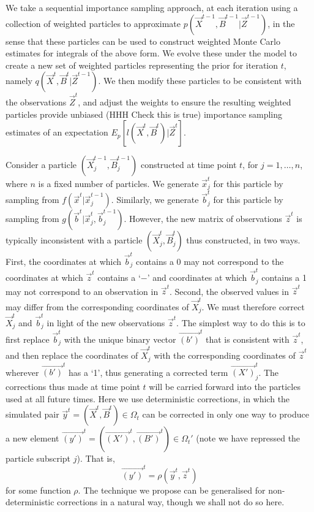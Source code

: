 We take a sequential importance sampling approach, at each iteration using a collection of weighted particles to approximate $p(\vec{X}^{t-1}, \vec{B}^{t-1} | \vec{Z}^{t-1})$, in the sense that these particles can be used to construct weighted Monte Carlo estimates for integrals of the above form. We evolve these under the model to create a new set of weighted particles representing the prior for iteration $t$, namely $q(\vec{X}^{t}, \vec{B}^{t} | \vec{Z}^{t-1})$. We then modify these particles to be consistent with the observations $\vec{Z}^{t}$, and adjust the weights to ensure the resulting weighted particles provide unbiased (HHH Check this is true) importance sampling estimates of an expectation $E_{p}[l(\vec{X}^{t}, \vec{B}^t) | \vec{Z}^t]$.

Consider a particle $(\vec{X}^{t-1}_j,\vec{B}^{t-1}_j)$ constructed at time point $t$, for $j = 1, \ldots, n$, where $n$ is a fixed number of particles. We generate $\vec{x}^t_j$ for this particle by sampling from $f(\vec{x}^t | \vec{x}^{t-1}_j)$. Similarly, we generate $\vec{b}^{t}_j$ for this particle by sampling from $g(\vec{b}^{t} | \vec{x}^t_j, \vec{b}^{t-1}_j)$. However, the new matrix of observations $\vec{z}^{t}$ is typically inconsistent with a particle $(\vec{X}^{t}_j, \vec{B}^{t}_j)$ thus constructed, in two ways. First, the coordinates at which $\vec{b}^{t}_j$ contains a 0 may not correspond to the coordinates at which $\vec{z}^{t}$ contains a `$-$' and coordinates at which $\vec{b}^{t}_j$ contains a 1 may not correspond to an observation in $\vec{z}^{t}$. Second, the observed values in $\vec{z}^{t}$ may differ from the corresponding coordinates of $\vec{X}^{t}_j$. We must therefore correct $\vec{X}^{t}_j$ and $\vec{b}^{t}_j$ in light of the new observations $\vec{z}^{t}$. The simplest way to do this is to first replace $\vec{b}^{t}_j$ with the unique binary vector $\vec{(b')}^{t}$ that is consistent with $\vec{z}^{t}$, and then replace the coordinates of $\vec{X}^{t}_j$ with the corresponding coordinates of $\vec{z}^{t}$ wherever $\vec{(b')}^{t}$ has a `1', thus generating a corrected term $\vec{(X')}^{t}_j$. The corrections thus made at time point $t$ will be carried forward into the particles used at all future times. Here we use deterministic corrections, in which the simulated pair $\vec{y}^{t} = (\vec{X}^{t}, \vec{B}^{t}) \in \Omega_t$ can be corrected in only one way to produce a new element $\vec{(y')}^{t} = (\vec{(X')}^t, \vec{(B')}^t) \in \Omega_t'$ (note we have repressed the particle subscript $j$). That is, 
\[
\vec{(y')}^{t} = \rho(\vec{y}^{t},\vec{z}^{t})
\]
for some function $\rho$. The technique we propose can be generalised for non-deterministic corrections in a natural way, though we shall not do so here.

